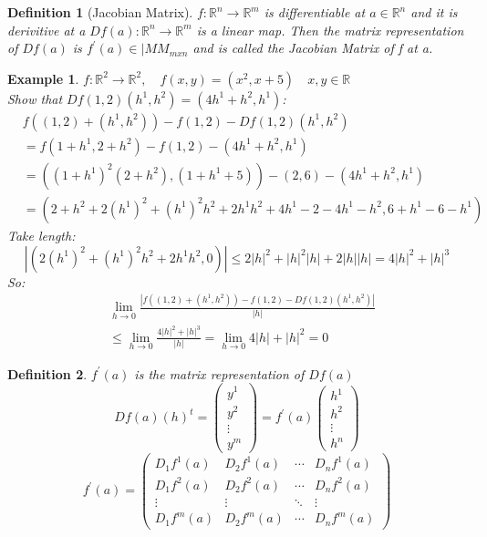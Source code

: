 \documentclass[12pt]{article}
\def\RR{\mathbb{R}}
\newtheorem{definition}{Definition}[section]
\newtheorem{example}{Example}[section]
\begin{document}
\begin{definition}[Jacobian Matrix]\label{D:Jacobian Matrix}
$f:\RR^{n} \rightarrow \RR^{m}$ is differentiable at $a \in \RR^{n}$ and it is derivitive at a $Df(a):\RR^{n} \rightarrow \RR^{m}$ is a linear map. Then the matrix representation of $Df(a)$ is $f^{'}(a) \in |MM_{mxn}$ and is called the Jacobian Matrix of f at a.
\end{definition}

\begin{example}\label{Df example}
$f:\RR^{2} \rightarrow \RR^{2}, \quad f(x,y)=(x^{2},x+5) \quad x,y \in \RR$\\
Show that $Df(1,2)(h^{1}, h^{2})=(4h^{1} +  h^{2}, h^{1})$:
\begin{align*}
&f((1,2) +(h^{1}, h^{2})) - f(1,2) -Df(1,2)(h^{1}, h^{2})\\
&= f(1+h^{1}, 2+ h^{2}) - f(1,2) - (4h^{1}+ h^{2}, h^{1})\\
&=((1+h^{1})^{2}(2+ h^{2}), (1+h^{1} +5)) - (2,6)  - (4h^{1}+ h^{2}, h^{1})\\
&=(2+ h^{2} + 2(h^{1})^{2} +(h^{1})^{2}h^{2} + 2h^{1}h^{2} + 4h^{1} -2 -4h^{1} -h^{2}, 6+h^{1} - 6 -h^{1})
\end{align*}
\textrm{Take length:}
\[|(2(h^{1})^{2} +(h^{1})^{2}h^{2} + 2h^{1}h^{2}, 0)| \leq 2|h|^{2} +|h|^{2}|h| + 2|h||h| = 4|h|^{2} + |h|^{3}\]
\textrm{So:}
\begin{align*}
&\lim_{h \to 0}\frac{|f((1,2) +(h^{1}, h^{2})) - f(1,2) -Df(1,2)(h^{1}, h^{2})|}{|h|}\\
& \leq
\lim_{h \to 0}\frac{4|h|^{2} + |h|^{3}}{|h|} =  \lim_{h \to 0}4|h| + |h|^{2}=0
\end{align*}
\end{example}

\begin{definition}
$f^{'}(a)$ is the matrix representation of $Df(a)$
\[Df(a)(h)^{t}= \left(\! \begin{array}{c} y^{1} \\ y^{2}\\ \vdots\\ y^{m} \end{array}\! \right) = f^{'}(a) \left(\! \begin{array}{c} h^{1} \\ h^{2}\\ \vdots\\ h^{n} \end{array}\! \right) \]
\[ f^{'}(a) = \begin{pmatrix}
  D_{1}f^{1}(a) & D_{2}f^{1}(a) & \cdots &D_{n}f^{1}(a) \\
  D_{1}f^{2}(a) & D_{2}f^{2}(a) & \cdots & D_{n}f^{2}(a) \\
  \vdots  & \vdots  & \ddots & \vdots  \\
  D_{1}f^{m}(a) & D_{2}f^{m}(a) & \cdots & D_{n}f^{m}(a)
 \end{pmatrix}\]
\end{definition}
\end{document}
